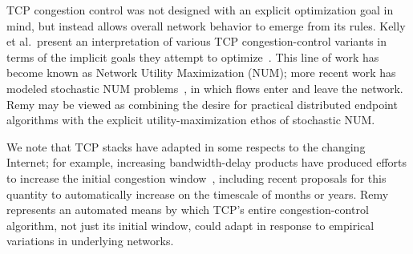 TCP congestion control was not designed with an explicit optimization
goal in mind, but instead allows overall network behavior to emerge
from its rules. Kelly et al.~present an interpretation of various TCP
congestion-control variants in terms of the implicit goals they
attempt to optimize~\cite{Kelly98}.  This line of work has become
known as Network Utility Maximization (NUM); more recent work has
modeled stochastic NUM problems~\cite{stochasticnum}, in which flows
enter and leave the network. Remy may be viewed as combining the
desire for practical distributed endpoint algorithms with the explicit
utility-maximization ethos of stochastic NUM.

We note that TCP stacks have adapted in some respects to the changing
Internet; for example, increasing bandwidth-delay products have
produced efforts to increase the initial congestion
window~\cite{dukkipati2010argument,chu2012increasing}, including
recent proposals \cite{allman2010init,touch2012automating} for this
quantity to automatically increase on the timescale of months or
years. Remy represents an automated means by which TCP's entire
congestion-control algorithm, not just its initial window, could adapt
in response to empirical variations in underlying networks.



